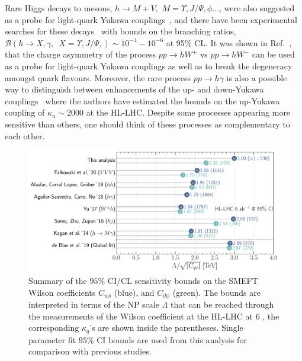 Rare Higgs decays to mesons, $h \to M +V ,\, \, M = \Upsilon, J/\Psi, \phi\dots$, were also suggested as a probe for light-quark Yukawa couplings~\cite{Bodwin:2013gca,Kagan:2014ila,Konig:2015qat}, and there have been experimental searches for these decays~\cite{ATLAS-CONF-2021-021,CMS:2018gcm} with bounds on the branching ratios, $\mathcal{B} (h \to X, \gamma, \,\,\, X =\Upsilon, J/\Psi,  ) \sim 10^{-4} - 10^{-6}$ at 95\% CL. It was shown in Ref.~\cite{Yu:2017vul}, that the charge asymmetry of the process $pp \to h W^+$ vs $ pp \to h W^-$ can be used as a probe for light-quark Yukawa couplings as well as to break the degeneracy amongst quark flavours. Moreover, the rare process $ pp \to h \gamma$ is also a possible way to distinguish between enhancements of the up- and down-Yukawa couplings~\cite{Aguilar-Saavedra:2020rgo} where the authors have estimated the bounds on the up-Yukawa coupling of $\kappa_u\sim 2000$ at the HL-LHC. Despite some processes appearing more sensitive than others, one should think of these processes as complementary to each other. 

\begin{figure}[t!]
	\includegraphics[width=\linewidth]{fig/ueberblick.pdf}
	\caption{Summary of the $95\%$ CI/CL sensitivity bounds on the SMEFT Wilson coefficients $C_{u\phi}$ (blue), and $C_{d\phi}$ (green). The bounds are interpreted in terms of the NP scale $\Lambda$ that can be reached through the measurements of the Wilson coefficient at the HL-LHC at $6$ \invab, the corresponding $\kappa_q$'s are shown inside the parentheses. Single parameter fit $95\%$ CI bounds are used from this analysis for comparison with previous studies.}
	\label{fig:comparison}
\end{figure}

